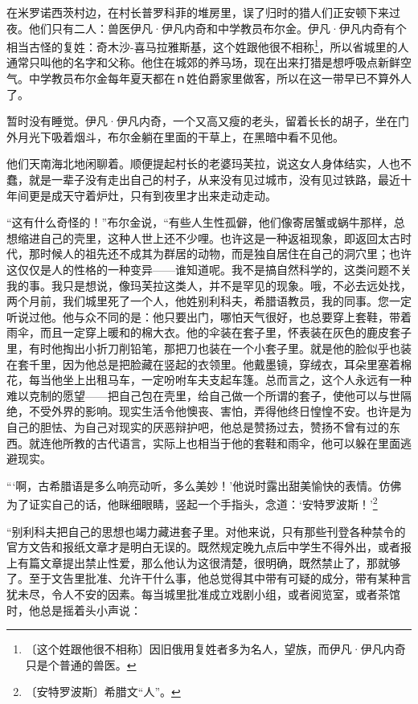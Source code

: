 \documentclass[12pt,UTF-8,openany]{ctexbook}
\begin{document}
\begin{normalsize}
    
    在米罗诺西茨村边，在村长普罗科菲的堆房里，误了归时的猎人们正安顿下来过夜。他们只有二人：兽医伊凡·伊凡内奇和中学教员布尔金。伊凡·伊凡内奇有个相当古怪的复姓：奇木沙-喜马拉雅斯基，这个姓跟他很不相称\footnote{〔这个姓跟他很不相称〕因旧俄用复姓者多为名人，望族，而伊凡·伊凡内奇只是个普通的兽医。}，所以省城里的人通常只叫他的名字和父称。他住在城郊的养马场，现在出来打猎是想呼吸点新鲜空气。中学教员布尔金每年夏天都在ｎ姓伯爵家里做客，所以在这一带早已不算外人了。
    
    暂时没有睡觉。伊凡·伊凡内奇，一个又高又瘦的老头，留着长长的胡子，坐在门外月光下吸着烟斗，布尔金躺在里面的干草上，在黑暗中看不见他。
    
    他们天南海北地闲聊着。顺便提起村长的老婆玛芙拉，说这女人身体结实，人也不蠢，就是一辈子没有走出自己的村子，从来没有见过城市，没有见过铁路，最近十年间更是成天守着炉灶，只有到夜里才出来走动走动。
    
    “这有什么奇怪的！”布尔金说，“有些人生性孤僻，他们像寄居蟹或蜗牛那样，总想缩进自己的壳里，这种人世上还不少哩。也许这是一种返祖现象，即返回太古时代，那时候人的祖先还不成其为群居的动物，而是独自居住在自己的洞穴里；也许这仅仅是人的性格的一种变异——谁知道呢。我不是搞自然科学的，这类问题不关我的事。我只是想说，像玛芙拉这类人，并不是罕见的现象。哦，不必去远处找，两个月前，我们城里死了一个人，他姓别利科夫，希腊语教员，我的同事。您一定听说过他。他与众不同的是：他只要出门，哪怕天气很好，也总要穿上套鞋，带着雨伞，而且一定穿上暖和的棉大衣。他的伞装在套子里，怀表装在灰色的鹿皮套子里，有时他掏出小折刀削铅笔，那把刀也装在一个小套子里。就是他的脸似乎也装在套千里，因为他总是把脸藏在竖起的衣领里。他戴墨镜，穿绒衣，耳朵里塞着棉花，每当他坐上出租马车，一定吩咐车夫支起车篷。总而言之，这个人永远有一种难以克制的愿望——把自己包在壳里，给自己做一个所谓的套子，使他可以与世隔绝，不受外界的影响。现实生活令他懊丧、害怕，弄得他终日惶惶不安。也许是为自己的胆怯、为自己对现实的厌恶辩护吧，他总是赞扬过去，赞扬不曾有过的东西。就连他所教的古代语言，实际上也相当于他的套鞋和雨伞，他可以躲在里面逃避现实。
    
    “‘啊，古希腊语是多么响亮动听，多么美妙！’他说时露出甜美愉快的表情。仿佛为了证实自己的话，他眯细眼睛，竖起一个手指头，念道：‘安特罗波斯！’\footnote{〔安特罗波斯〕希腊文“人”。}
    
    “别利科夫把自己的思想也竭力藏进套子里。对他来说，只有那些刊登各种禁令的官方文告和报纸文章才是明白无误的。既然规定晚九点后中学生不得外出，或者报上有篇文章提出禁止性爱，那么他认为这很清楚，很明确，既然禁止了，那就够了。至于文告里批准、允许干什么事，他总觉得其中带有可疑的成分，带有某种言犹未尽，令人不安的因素。每当城里批准成立戏剧小组，或者阅览室，或者茶馆时，他总是摇着头小声说：
    

\end{normalsize}
\end{document}
